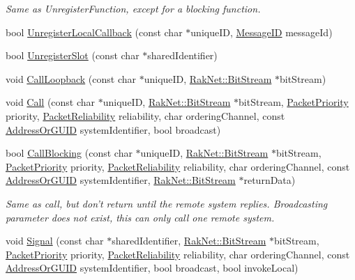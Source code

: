 \begin{DoxyCompactItemize}
\begin{DoxyCompactList}\small\item\em Same as Unregister\-Function, except for a blocking function. \end{DoxyCompactList}\item 
bool \hyperlink{class_rak_net_1_1_r_p_c4_acf39698d278c8d05d199086fe846ca6a}{Unregister\-Local\-Callback} (const char $\ast$unique\-I\-D, \hyperlink{namespace_rak_net_a1b2f3bf4bad2bb6a8360a12295fbed0c}{Message\-I\-D} message\-Id)
\item 
bool \hyperlink{class_rak_net_1_1_r_p_c4_af9ff734939d0ae4e2dbf0ab2e16f6ca5}{Unregister\-Slot} (const char $\ast$shared\-Identifier)
\item 
void \hyperlink{class_rak_net_1_1_r_p_c4_a94a6c4503e9639d65e052a685d458878}{Call\-Loopback} (const char $\ast$unique\-I\-D, \hyperlink{class_rak_net_1_1_bit_stream}{Rak\-Net\-::\-Bit\-Stream} $\ast$bit\-Stream)
\item 
void \hyperlink{class_rak_net_1_1_r_p_c4_afcf702778c734ec2cd0a0513e77fb380}{Call} (const char $\ast$unique\-I\-D, \hyperlink{class_rak_net_1_1_bit_stream}{Rak\-Net\-::\-Bit\-Stream} $\ast$bit\-Stream, \hyperlink{_packet_priority_8h_a659378374e516180f93640c79f59705c}{Packet\-Priority} priority, \hyperlink{_packet_priority_8h_ae41fa01235e99dced384d137fa874a7e}{Packet\-Reliability} reliability, char ordering\-Channel, const \hyperlink{struct_rak_net_1_1_address_or_g_u_i_d}{Address\-Or\-G\-U\-I\-D} system\-Identifier, bool broadcast)
\item 
bool \hyperlink{class_rak_net_1_1_r_p_c4_ac224d0d8b1f23817488c14b9fe2d2d36}{Call\-Blocking} (const char $\ast$unique\-I\-D, \hyperlink{class_rak_net_1_1_bit_stream}{Rak\-Net\-::\-Bit\-Stream} $\ast$bit\-Stream, \hyperlink{_packet_priority_8h_a659378374e516180f93640c79f59705c}{Packet\-Priority} priority, \hyperlink{_packet_priority_8h_ae41fa01235e99dced384d137fa874a7e}{Packet\-Reliability} reliability, char ordering\-Channel, const \hyperlink{struct_rak_net_1_1_address_or_g_u_i_d}{Address\-Or\-G\-U\-I\-D} system\-Identifier, \hyperlink{class_rak_net_1_1_bit_stream}{Rak\-Net\-::\-Bit\-Stream} $\ast$return\-Data)
\begin{DoxyCompactList}\small\item\em Same as call, but don't return until the remote system replies. Broadcasting parameter does not exist, this can only call one remote system. \end{DoxyCompactList}\item 
void \hyperlink{class_rak_net_1_1_r_p_c4_afd3487232245b9d7d7d9e332bf09155d}{Signal} (const char $\ast$shared\-Identifier, \hyperlink{class_rak_net_1_1_bit_stream}{Rak\-Net\-::\-Bit\-Stream} $\ast$bit\-Stream, \hyperlink{_packet_priority_8h_a659378374e516180f93640c79f59705c}{Packet\-Priority} priority, \hyperlink{_packet_priority_8h_ae41fa01235e99dced384d137fa874a7e}{Packet\-Reliability} reliability, char ordering\-Channel, const \hyperlink{struct_rak_net_1_1_address_or_g_u_i_d}{Address\-Or\-G\-U\-I\-D} system\-Identifier, bool broadcast, bool invoke\-Local)

\end{DoxyCompactItemize}
